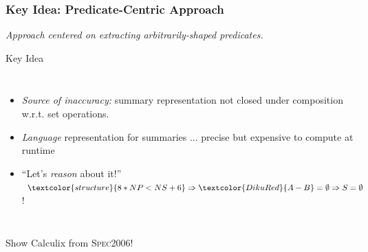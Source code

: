 \documentclass{beamer}
\renewcommand{\emph}[1]{\textcolor{structure}{#1}}
\newcommand{\emp}[1]{\textcolor{DikuRed}{ #1}}
\begin{document}
\begin{frame}[fragile,t]
  \frametitle{Key Idea: Predicate-Centric Approach}

\smallskip

{\em Approach centered on extracting arbitrarily-shaped predicates.} 

\bigskip

\begin{block}{Key Idea} 
\begin{columns} 
 \vspace{-2ex}
\begin{itemize}
    \item \emp{{\em Source of inaccuracy:}} summary representation not closed under composition w.r.t. set operations. \bigskip
    \item \emph{{\em Language}} representation for summaries ... precise but \emp{expensive} to compute at runtime \bigskip
    \item ``Let's \emph{{\em reason}} about it!'' $\emph{8*NP < NS + 6} \Rightarrow \emp{A - B} = \emptyset \Rightarrow S=\emptyset$!
\end{itemize}
\hspace{-2ex}\includegraphics[height=30ex]{ParTeaserFigs/USR_HE_FIND_SOLVH}
\end{columns}
\end{block}

\alert{Show Calculix from \textsc{Spec2006}}!

\end{frame}
\end{document}
